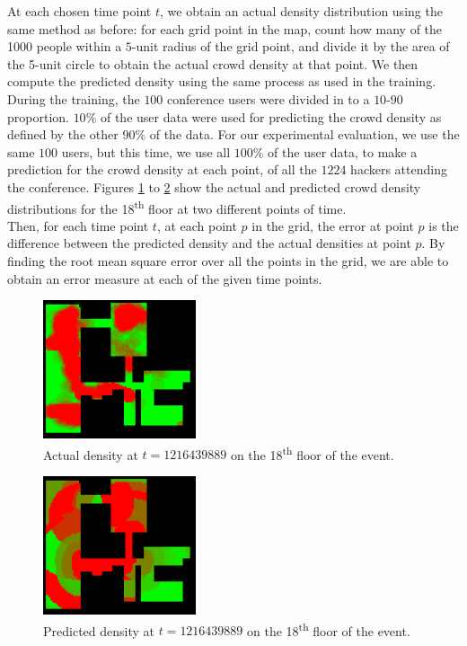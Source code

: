 \documentclass[letterpaper]{article}
\begin{document}
At each chosen time point $t$, we obtain an actual density distribution using the same method as before: for each grid point in the map, count how many of the 1000 people within a $5$-unit radius of the grid point, and divide it by the area of the 5-unit circle to obtain the actual crowd density at that point. We then compute the predicted density using the same process as used in the training. During the training, the $100$ conference users were divided in to a $10$-$90$ proportion. $10\%$ of the user data were used for predicting the crowd density as defined by the other $90\%$ of the data. For our experimental evaluation, we use the same $100$ users, but this time, we use all $100\%$ of the user data, to make a prediction for the crowd density at each point, of all the $1224$ hackers attending the conference. Figures \ref{fig:t1dist} to \ref{fig:t2dist} show the actual and predicted crowd density distributions for the 18\textsuperscript{th} floor at two different points of time.\\

Then, for each time point $t$, at each point $p$ in the grid, the error at point $p$ is the difference between the predicted density and the actual densities at point $p$. By finding the root mean square error over all the points in the grid, we are able to obtain an error measure at each of the given time points.\\

\begin{figure}[h!]
  \centering
    \includegraphics[width=170px]{diagrams/26-27_86-83_59-49_1216439889_actual.png}
  \caption{Actual density at $t=1216439889$ on the 18\textsuperscript{th} floor of the event.}
  \label{fig:t1dist}
\end{figure}

\begin{figure}[h!]
  \centering
    \includegraphics[width=170px]{diagrams/26-27_86-83_59-49_1216439889_predicted.png}
  \caption{Predicted density at $t=1216439889$ on the 18\textsuperscript{th} floor of the event.}
  \label{fig:t2dist}
\end{figure}
\end{document}

